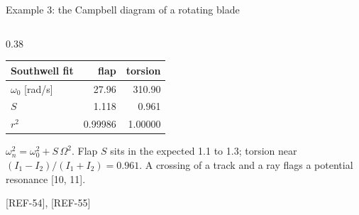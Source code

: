\begin{frame}{Example 3: the Campbell diagram of a rotating blade}
\begin{columns}[T]
\begin{column}{0.38\textwidth}
{\ftstablesize\renewcommand{\arraystretch}{1.15}
\begin{tabular}{@{}lrr@{}}
\toprule
\textbf{Southwell fit} & \textbf{flap} & \textbf{torsion} \\
\midrule
\(\omega_0\) [rad/s] & 27.96 & 310.90 \\
\(S\) & 1.118 & 0.961 \\
\(r^2\) & 0.99986 & 1.00000 \\
\bottomrule
\end{tabular}}
\par\vspace{1.5mm}
{\scriptsize \(\omega_n^2 = \omega_0^2 + S\,\Omega^2\). Flap \(S\) sits in
the expected 1.1 to 1.3; torsion near \((I_1 - I_2)/(I_1 + I_2) = 0.961\).
A crossing of a track and a ray flags a potential resonance [10, 11].\par} [REF-54], [REF-55]
\end{column}
\end{columns}
\end{frame}
